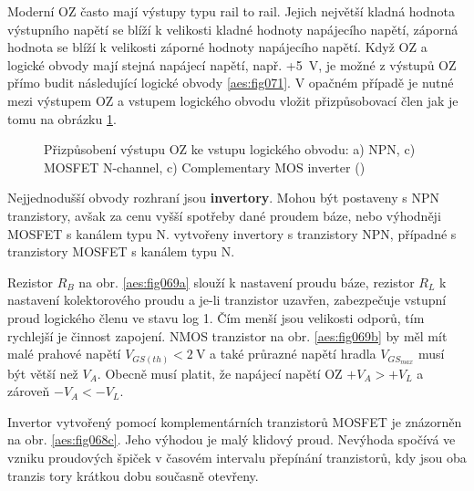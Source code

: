 
    Moderní OZ často mají výstupy typu rail to rail. Jejich největší kladná hodnota výstupního
    napětí se blíží k velikosti kladné hodnoty napájecího napětí, záporná hodnota se blíží k
    velikosti záporné hodnoty napájecího napětí. Když OZ a logické obvody mají stejná napájecí
    napětí, např. +\SI{5}{\volt}, je možné z výstupů OZ přímo budit následující logické obvody
    \ref{aes:fig071}. V opačném případě je nutné mezi výstupem OZ a vstupem logického obvodu vložit
    přizpůsobovací člen \cite[s.~2]{AN849} jak je tomu na obrázku \ref{aes:fig069}.
    

    \begin{figure}[ht!]  %
      \centering
         \newline
      \caption{Přizpůsobení výstupu OZ ke vstupu logického obvodu: a) NPN, c) MOSFET N-channel, c)
                Complementary MOS inverter (\cite[s.~2]{AN849})}
      \label{aes:fig069}
    \end{figure}

    Nejjednodušší obvody rozhraní jsou \textbf{invertory}. Mohou být postaveny s NPN tranzistory,
    avšak za cenu vyšší spotřeby dané proudem báze, nebo výhodněji MOSFET s kanálem typu N.
    vytvořeny invertory s tranzistory NPN, případné s tranzistory MOSFET s kanálem typu N. 
    
    Rezistor \(R_B\) na obr. \ref{aes:fig069a} slouží k nastavení proudu báze, rezistor \(R_L\) k
    nastavení kolektorového proudu a je-li tranzistor uzavřen, zabezpeču­je vstupní proud logického
    členu ve stavu log 1. Čím menší jsou velikosti odporů, tím rychlejší je činnost zapojení. NMOS
    tranzistor na obr. \ref{aes:fig069b} by měl mít malé prahové napětí \(V_{GS(th)}
    <\SI{2}{\volt}\) a také průrazné napětí hradla \(V_{GS_{max}}\) musí být větší než \(V_A\).
    Obecně musí platit, že napájecí napětí OZ \(+V_A > +V_L\) a zároveň \(-V_A < -V_L\).

    Invertor vytvořený pomocí komplementárních tranzistorů MOSFET je znázorněn na obr.
    \ref{aes:fig068c}. Jeho výhodou je malý klidový proud. Nevýhoda spočívá ve vzniku proudových
    špiček v časovém intervalu přepínání tranzistorů, kdy jsou oba tranzis tory krátkou dobu
    současně otevřeny.

